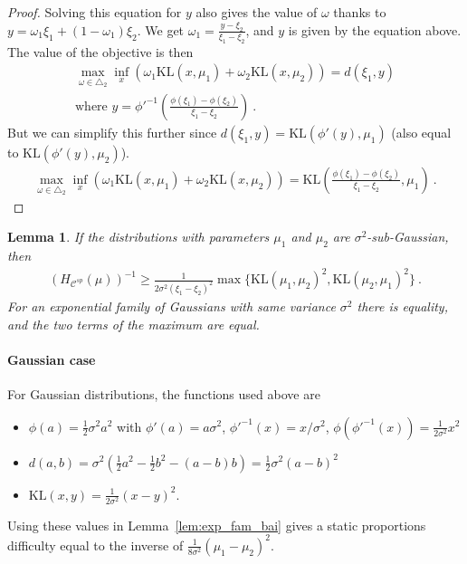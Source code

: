 \documentclass{article}
\newcommand{\KL}{\mathrm{KL}}
\newtheorem{lemma}{Lemma}
\begin{document}
\begin{proof}
Solving this equation for $y$ also gives the value of $\omega$ thanks to $y = \omega_1 \xi_1 + (1 - \omega_1) \xi_2$. We get $\omega_1 = \frac{y - \xi_2}{\xi_1 - \xi_2}$, and $y$ is given by the equation above.
The value of the objective is then
\begin{align*}
\max_{\omega \in \triangle_2} \inf_{x} (\omega_1 \KL(x, \mu_1) + \omega_2 \KL(x, \mu_2))
= d(\xi_1, y)
\\
\text{where }
y = \phi'^{-1}\left(\frac{\phi(\xi_1) - \phi(\xi_2)}{\xi_1 - \xi_2}\right)
\: .
\end{align*}
But we can simplify this further since $d(\xi_1, y) = \KL(\phi'(y), \mu_1)$ (also equal to $\KL(\phi'(y), \mu_2)$).
\begin{align*}
\max_{\omega \in \triangle_2} \inf_{x} (\omega_1 \KL(x, \mu_1) + \omega_2 \KL(x, \mu_2))
= \KL(\frac{\phi(\xi_1) - \phi(\xi_2)}{\xi_1 - \xi_2}, \mu_1)
\: .
\end{align*}
\end{proof}

\begin{lemma}
If the distributions with parameters $\mu_1$ and $\mu_2$ are $\sigma^2$-sub-Gaussian, then
\begin{align*}
(H_{\mathcal C^{sp}}(\mu))^{-1}
\ge \frac{1}{2 \sigma^2(\xi_1 - \xi_2)^2}\max\{\KL(\mu_1, \mu_2)^2, \KL(\mu_2, \mu_1)^2\}
\: .
\end{align*}
For an exponential family of Gaussians with same variance $\sigma^2$ there is equality, and the two terms of the maximum are equal.
\end{lemma}


\paragraph{Gaussian case}
For Gaussian distributions, the functions used above are
\begin{itemize}
	\item $\phi(a) = \frac{1}{2} \sigma^2 a^2$ with $\phi'(a) = a \sigma^2$, $\phi'^{-1}(x) = x / \sigma^2$, $\phi(\phi'^{-1}(x)) = \frac{1}{2 \sigma^2} x^2$
	\item $d(a, b) = \sigma^2(\frac{1}{2} a^2 - \frac{1}{2} b^2 - (a - b) b) = \frac{1}{2}\sigma^2(a - b)^2$
	\item $\KL(x, y) = \frac{1}{2 \sigma^2}(x - y)^2$.
\end{itemize}

Using these values in Lemma~\ref{lem:exp_fam_bai} gives a static proportions difficulty equal to the inverse of $\frac{1}{8 \sigma^2}(\mu_1 - \mu_2)^2$.
\end{document}
